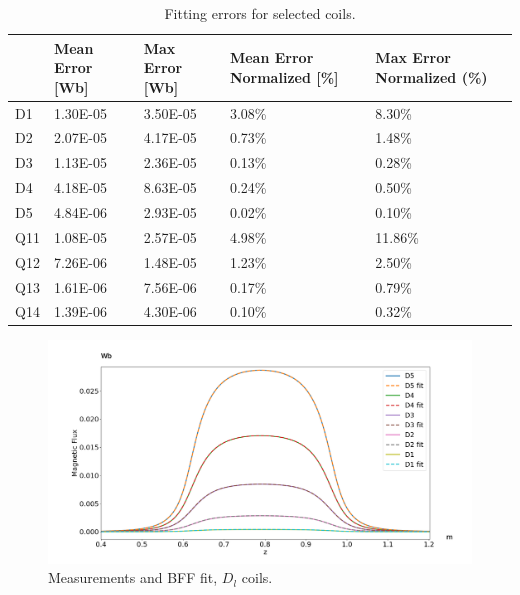 \begin{table}[!h]
    \centering
    \begin{tabular}{l p{2cm} p{2cm} p{2cm} p{2cm}}
            & Mean Error {[}Wb{]} & Max Error {[}Wb{]} & Mean Error Normalized {[}\%{]} & Max Error Normalized (\%) \\ \hline
        D1  & 1.30E-05            & 3.50E-05           & 3.08\%                         & 8.30\%                    \\
        D2  & 2.07E-05            & 4.17E-05           & 0.73\%                         & 1.48\%                    \\
        D3  & 1.13E-05            & 2.36E-05           & 0.13\%                         & 0.28\%                    \\
        D4  & 4.18E-05            & 8.63E-05           & 0.24\%                         & 0.50\%                    \\
        D5  & 4.84E-06            & 2.93E-05           & 0.02\%                         & 0.10\%                    \\
        Q11 & 1.08E-05            & 2.57E-05           & 4.98\%                         & 11.86\%                   \\
        Q12 & 7.26E-06            & 1.48E-05           & 1.23\%                         & 2.50\%                    \\
        Q13 & 1.61E-06            & 7.56E-06           & 0.17\%                         & 0.79\%                    \\
        Q14 & 1.39E-06            & 4.30E-06           & 0.10\%                         & 0.32\%
    \end{tabular}
    \caption{Fitting errors for selected coils.}
    \label{tab:fitting-errors}
\end{table}

\begin{figure}[!h]
    \centering
    \includegraphics[width=\linewidth]{figs/Dfit}
    \caption{Measurements and BFF fit, $D_l$ coils.}
    \label{fig:Dfit}
\end{figure}

